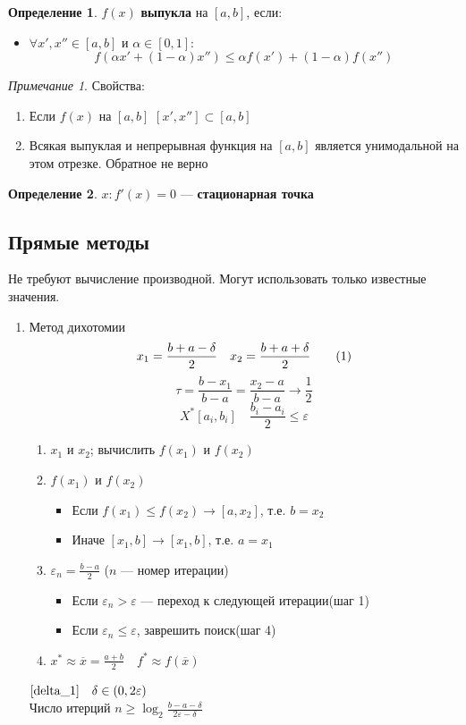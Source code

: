 \documentclass[oneside]{book}
\newcommand\addtag{\refstepcounter{equation}\tag{\theequation}}
\theoremstyle{plain}
\theoremstyle{remark}
\newtheorem*{remark}{Примечание}
\theoremstyle{definition}
\newtheorem*{definition}{Определение}
\begin{document}
\begin{definition}
\(f(x)\) \textbf{выпукла} на \([a, b]\), если:
\begin{itemize}
\item \(\forall x', x'' \in [a, b]\) и \(\alpha \in [0, 1]\): \\
\[ f(\alpha x' + (1 - \alpha)x'') \le \alpha f(x') + (1 - \alpha)f(x'') \]
\end{itemize}
\end{definition}
\begin{remark}
Свойства:
\begin{enumerate}
\item Если \(f(x)\) на \([a, b]\) \([x', x''] \subset [a, b]\)
\item Всякая выпуклая и непрерывная функция на \([a, b]\) является унимодальной на этом отрезке. Обратное не верно
\end{enumerate}
\end{remark}
\begin{definition}
\(x: f'(x) = 0\) --- \textbf{стационарная точка}
\end{definition}


\subsection{Прямые методы}
\label{sec:orgdf1ef35}
Не требуют вычисление производной. Могут использовать только известные значения. 
\begin{enumerate}
\item Метод дихотомии
\label{sec:org7d643cb}
\[ x_1 = \frac{b + a - \delta}{2}\quad x_2 = \frac{b + a + \delta}{2} \addtag\label{delta_1} \]
\[ \tau = \frac{b - x_1}{b - a} = \frac{x_2 - a}{b - a} \rightarrow \frac{1}{2} \]
\[ X^* [a_i, b_i]\quad \frac{b_i - a_i}{2} \le \varepsilon \]

\begin{enumerate}
\item \(x_1\) и \(x_2\); вычислить \(f(x_1)\) и \(f(x_2)\)
\item \(f(x_1)\) и \(f(x_2)\)
\begin{itemize}
\item Если \(f(x_1) \le f(x_2) \rightarrow [a, x_2]\), т.е. \(b = x_2\)
\item Иначе \([x_1, b] \rightarrow [x_1, b]\), т.е. \(a = x_1\)
\end{itemize}
\item \(\varepsilon_n = \frac{b - a}{2}\) (\(n\) --- номер итерации)
\begin{itemize}
\item Если \(\varepsilon_n > \varepsilon\) --- переход к следующей итерации(шаг 1)
\item Если \(\varepsilon_n \le \varepsilon\), заврешить поиск(шаг 4)
\end{itemize}
\item \(x^* \approx \overline{x} = \frac{a + b}{2} \quad f^* \approx f(\overline{x})\)
\end{enumerate}

\(\ref{delta_1}\quad \delta \in (0, 2\varepsilon)\) \\
Число итерций \(n \ge \log_2\frac{b - a - \delta}{2\varepsilon - \delta}\)
\end{enumerate}
\end{document}
